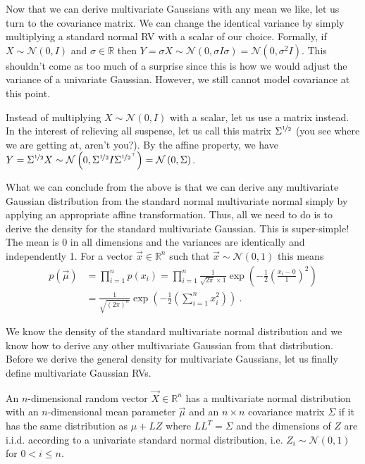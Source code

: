 \documentclass[a4paper,11pt,leqno]{report}\usepackage[]{graphicx}\usepackage[]{color}
\newcommand{\N}[2]{\mathcal{N}\left( #1, #2 \right)}
\begin{document}
Now that we can derive multivariate Gaussians with any mean we like, let us turn to the covariance matrix. We can change the identical variance by simply multiplying
a standard normal RV with a scalar of our choice. Formally, if $ X \sim \N{0}{I} $ and $ \sigma \in \mathbb{R} $ then 
$ Y = \sigma X \sim \N{0} {\sigma I \sigma} = \N{0} {\sigma^{2}I} $. This shouldn't come as too much of a surprise since this is how we would adjust 
the variance of a univariate Gaussian. However, we still cannot model covariance at this point. 

Instead of multiplying $ X \sim \N{0}{I} $ with a scalar, let us use a matrix instead. In the interest of relieving all suspense, let us call this matrix $ \Sigma^{\nicefrac{1}{2}} $
(you see where we are getting at, aren't you?). By the affine property, we have 
$ Y = \Sigma^{\nicefrac{1}{2}} X \sim \N{0}{\Sigma^{\nicefrac{1}{2}} I \Sigma^{\nicefrac{1}{2}^{\top}}} = \N{0}{\Sigma} $. 

What we can conclude from the above is that we can derive any multivariate Gaussian distribution from the standard normal multivariate normal simply by applying an
appropriate affine transformation. Thus, all we need to do is to derive the density for the standard multivariate Gaussian. This is super-simple! The mean is $ 0 $
in all dimensions and the variances are identically and independently 1. For a vector $ \vec{x} \in \mathbb{R}^{n} $ such that $ \vec{x} \sim \N{0}{1} $ this means
\begin{align}\label{eq:mvstandardNormal}
p(\vec{\mu}) &= \prod_{i=1}^{n} p(x_{i}) = \prod_{i=1}^{n} \frac{1}{\sqrt{2\pi} \times 1} \exp \left(-\frac{1}{2}\left( \frac{x_{i} - 0}{1} \right)^{2} \right) \\
&= \frac{1}{\sqrt{(2\pi)^{n}}} \exp \left(-\frac{1}{2}\left( \sum_{i=1}^{n}x_{i}^{2} \right) \right) \ . \nonumber
\end{align}

We know the density of the standard multivariate normal distribution and we know how to derive any other multivariate Gaussian from that distribution. Before
we derive the general density for multivariate Gaussians, let us finally define multivariate Gaussian RVs.
\begin{Definition}
An $ n $-dimensional random vector $ \vec{X} \in \mathbb{R}^{n} $ has a multivariate normal distribution with an $ n $-dimensional mean parameter 
$ \vec{\mu} $ and an $ n \times n $ covariance matrix $ \Sigma $ if it has the same distribution as $ \mu + LZ $ where $ LL^{T} = \Sigma $ and 
the dimensions of $ Z $ are i.i.d. according to a univariate standard normal distribution, i.e. $ Z_{i} \sim \N{0}{1} $ for $ 0 < i \leq n $.
\end{Definition}
\end{document}
